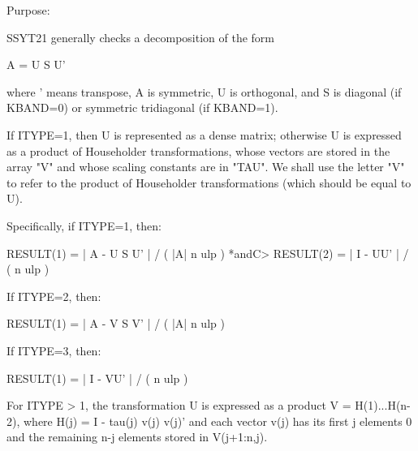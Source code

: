 \begin{DoxyParagraph}{Purpose\+: }
\begin{DoxyVerb} SSYT21 generally checks a decomposition of the form

    A = U S U'

 where ' means transpose, A is symmetric, U is orthogonal, and S is
 diagonal (if KBAND=0) or symmetric tridiagonal (if KBAND=1).

 If ITYPE=1, then U is represented as a dense matrix; otherwise U is
 expressed as a product of Householder transformations, whose vectors
 are stored in the array "V" and whose scaling constants are in "TAU".
 We shall use the letter "V" to refer to the product of Householder
 transformations (which should be equal to U).

 Specifically, if ITYPE=1, then:

    RESULT(1) = | A - U S U' | / ( |A| n ulp ) *andC>    RESULT(2) = | I - UU' | / ( n ulp )

 If ITYPE=2, then:

    RESULT(1) = | A - V S V' | / ( |A| n ulp )

 If ITYPE=3, then:

    RESULT(1) = | I - VU' | / ( n ulp )

 For ITYPE > 1, the transformation U is expressed as a product
 V = H(1)...H(n-2),  where H(j) = I  -  tau(j) v(j) v(j)' and each
 vector v(j) has its first j elements 0 and the remaining n-j elements
 stored in V(j+1:n,j).\end{DoxyVerb}
 
\end{DoxyParagraph}

